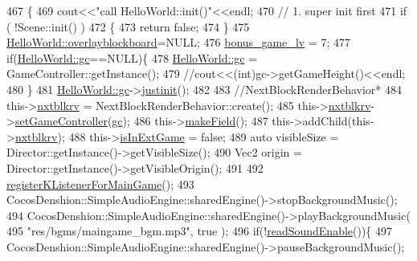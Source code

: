 \begin{DoxyCode}
467 \{
469     cout<<\textcolor{stringliteral}{"call HelloWorld::init()"}<<endl;
470     \textcolor{comment}{// 1. super init first}
471     \textcolor{keywordflow}{if} ( !Scene::init() )
472     \{
473         \textcolor{keywordflow}{return} \textcolor{keyword}{false};
474     \}
475     \hyperlink{class_hello_world_acc967707dff45c20f68321f07c86a21b}{HelloWorld::overlayblockboard}=NULL;
476     \hyperlink{class_hello_world_a7832a6ec52f92f460f3fc352a06412f4}{bonus\_game\_lv} = 7;
477     \textcolor{keywordflow}{if}(\hyperlink{class_hello_world_a547cb213126911d9a7151f8259dc7102}{HelloWorld::gc}==NULL)\{
478         \hyperlink{class_hello_world_a547cb213126911d9a7151f8259dc7102}{HelloWorld::gc} = GameController::getInstance();
479         \textcolor{comment}{//cout<<(int)gc->getGameHeight()<<endl;}
480     \}
481     \hyperlink{class_hello_world_a547cb213126911d9a7151f8259dc7102}{HelloWorld::gc}->\hyperlink{class_tetris_1_1_game_controller_aef406397d4719c9edd49774d0343ce05}{justinit}();
482     
483     \textcolor{comment}{//NextBlockRenderBehavior*}
484     this->\hyperlink{class_hello_world_ac06ca16fc5a18d32c58e0229c24817f6}{nxtblkrv} = NextBlockRenderBehavior::create();
485     this->\hyperlink{class_hello_world_ac06ca16fc5a18d32c58e0229c24817f6}{nxtblkrv}->\hyperlink{class_tetris_1_1_views_1_1_next_block_render_behavior_a35709270c896ca2a21266b52727412ae}{setGameController}(\hyperlink{class_hello_world_a547cb213126911d9a7151f8259dc7102}{gc});
486     this->\hyperlink{class_hello_world_ac7cca1564e8be641f0d52b97040c0a69}{makeField}();
487     this->addChild(this->\hyperlink{class_hello_world_ac06ca16fc5a18d32c58e0229c24817f6}{nxtblkrv});
488     this->\hyperlink{class_hello_world_a6dcd196f83b5eba681717366944fcddf}{isInExtGame} = \textcolor{keyword}{false};
489     \textcolor{keyword}{auto} visibleSize = Director::getInstance()->getVisibleSize();
490     Vec2 origin = Director::getInstance()->getVisibleOrigin();
491     
492     \hyperlink{class_hello_world_a15deb2e6546d6fd41267dc91932ade26}{registerKListenerForMainGame}();
493     CocosDenshion::SimpleAudioEngine::sharedEngine()->stopBackgroundMusic();
494     CocosDenshion::SimpleAudioEngine::sharedEngine()->playBackgroundMusic(
495                                                                           \textcolor{stringliteral}{"res/bgms/maingame\_bgm.mp3"}, \textcolor{keyword}{true}
      );
496     \textcolor{keywordflow}{if}(!\hyperlink{class_hello_world_a0f8c9d1b95e03b397e680b9dafb8f3d9}{readSoundEnable}())\{
497         CocosDenshion::SimpleAudioEngine::sharedEngine()->pauseBackgroundMusic();

\end{DoxyCode}

